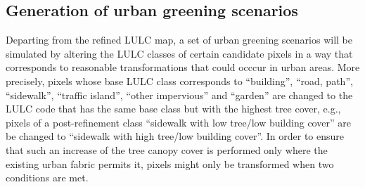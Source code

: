 \documentclass[10pt,letterpaper]{article}
\begin{document}



\subsection*{Generation of urban greening scenarios}

Departing from the refined LULC map, a set of urban greening scenarios will be simulated by altering the LULC classes of certain candidate pixels in a way that corresponds to reasonable transformations that could occcur in urban areas.
More precisely, pixels whose base LULC class corresponds to ``building'', ``road, path'', ``sidewalk'', ``traffic island'', ``other impervious'' and ``garden'' are changed to the LULC code that has the same base class but with the highest tree cover, e.g.,  pixels of a post-refinement class ``sidewalk with low tree/low building cover'' are be changed to ``sidewalk with high tree/low building cover''.
In order to ensure that such an increase of the tree canopy cover is performed only where the existing urban fabric permits it, pixels might only be transformed when two conditions are met.
\end{document}
